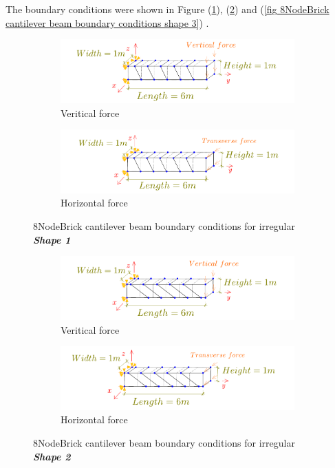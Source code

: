 \documentclass[fleqn,11pt,letter]{article}
\begin{document}
The boundary conditions were shown in Figure (\ref{fig 8NodeBrick cantilever beam boundary conditions shape 1}), (\ref{fig 8NodeBrick cantilever beam boundary conditions shape 2}) and (\ref{fig 8NodeBrick cantilever beam boundary conditions shape 3}) .

\begin{figure}[H]
  \centering
    \begin{subfigure}{0.5\textwidth}
      \centering
      \includegraphics[width=9cm]{../Figure_files/8NodeBrick/beam_brick_shape1_vertical.pdf}
      \caption{Veritical force}
    \end{subfigure}
    \begin{subfigure}{0.5\textwidth}
      \centering
      \includegraphics[width=9cm]{../Figure_files/8NodeBrick/beam_brick_shape1_horizontal.pdf}
      \caption{Horizontal force}
    \end{subfigure}
  \caption{8NodeBrick cantilever beam boundary conditions for irregular \textbf{\emph{Shape 1}} }
  \label{fig 8NodeBrick cantilever beam boundary conditions shape 1}
\end{figure}


\begin{figure}[H]
  \centering
    \begin{subfigure}{0.5\textwidth}
      \centering
      \includegraphics[width=9cm]{../Figure_files/8NodeBrick/beam_brick_shape2_vertical.pdf}
      \caption{Veritical force}
    \end{subfigure}
    \begin{subfigure}{0.5\textwidth}
      \centering
      \includegraphics[width=9cm]{../Figure_files/8NodeBrick/beam_brick_shape2_horizontal.pdf}
      \caption{Horizontal force}
    \end{subfigure}
  \caption{8NodeBrick cantilever beam boundary conditions for irregular \textbf{\emph{Shape 2}} }
  \label{fig 8NodeBrick cantilever beam boundary conditions shape 2}
\end{figure}
\end{document}
